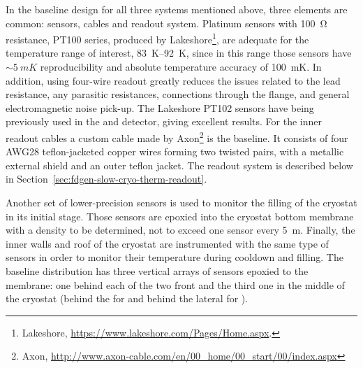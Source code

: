 In the baseline design for all three systems mentioned above, three elements are common: sensors, cables and readout system.
Platinum sensors with \SI{100}{\ohm} resistance, PT100 series, produced by Lakeshore\footnote{Lakeshore\texttrademark{}, \url{https://www.lakeshore.com/Pages/Home.aspx}.},
are adequate for the temperature range of interest, \SIrange{83}{92}{K}, since in this range those sensors have $\sim\SI{5}{mK}$ reproducibility 
 and absolute temperature accuracy of \SI{100}{mK}.
In addition, using four-wire readout greatly reduces the issues related to the lead resistance, any parasitic resistances,
connections through the flange, and general electromagnetic noise pick-up. The Lakeshore PT102 sensors
have being previously used in the  and  detector,
giving excellent results. For the inner readout cables a custom cable made by Axon\footnote{Axon\texttrademark{}, \url{http://www.axon-cable.com/en/00_home/00_start/00/index.aspx}} is the baseline. It consists of four AWG28 teflon-jacketed copper wires forming two twisted pairs, with a metallic external shield
and an outer teflon jacket.
The readout system is described below in  Section~\ref{sec:fdgen-slow-cryo-therm-readout}. %



Another set of lower-precision sensors is used to monitor the filling of the cryostat in its initial stage. Those sensors are epoxied into the cryostat bottom membrane with
a density to be determined, not to exceed one sensor every \SI{5}{m}. 
Finally, the inner walls and roof of the cryostat are instrumented with the same type of sensors in order to monitor their temperature during cooldown and filling.
The baseline distribution has three vertical arrays of sensors epoxied to the membrane: one behind each of the two %
front  and the third one in the middle of the cryostat
(behind the  for \single and behind the lateral %
 for \dual). 

